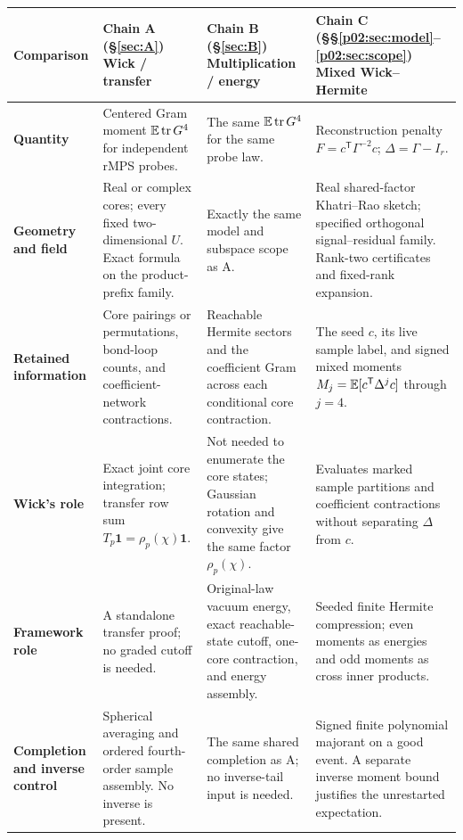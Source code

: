 \documentclass[11pt]{article}
\numberwithin{equation}{section}
\theoremstyle{definition}\newtheorem{definition}[theorem]{Definition}
\theoremstyle{remark}\newtheorem{remark}[theorem]{Remark}
\newcommand{\tr}{\operatorname{tr}}\newcommand{\Ent}{\operatorname{Ent}}
\newcommand{\one}{\mathbf1}\newcommand{\F}{\mathbb F}
\begin{document}
\begin{tabularx}{\textwidth}{@{}P{.14\textwidth}YYY@{}}
\toprule
\textbf{Comparison} &
{\color{Teal}\textbf{Chain A} (\S\ref{sec:A})\newline Wick / transfer} &
{\color{Navy}\textbf{Chain B} (\S\ref{sec:B})\newline Multiplication / energy} &
{\color{Amber}\textbf{Chain C} (\S\S\ref{p02:sec:model}--\ref{p02:sec:scope})\newline Mixed Wick--Hermite}\\
\midrule
{}
\textbf{Quantity} &
Centered Gram moment $\E\tr G^4$ for independent rMPS probes. &
The same $\E\tr G^4$ for the same probe law. &
Reconstruction penalty $F=c^{\mathsf T}\Gamma^{-2}c$;
$\Delta=\Gamma-I_r$.\\[3pt]
\textbf{Geometry and field} &
Real or complex cores; every fixed two-dimensional $U$.
Exact formula on the product-prefix family. &
Exactly the same model and subspace scope as A. &
Real shared-factor Khatri--Rao sketch; specified orthogonal signal--residual
family. Rank-two certificates and fixed-rank expansion.\\[3pt]
\textbf{Retained information} &
Core pairings or permutations, bond-loop counts, and coefficient-network
contractions. &
Reachable Hermite sectors and the coefficient Gram across each
conditional core contraction. &
The seed $c$, its live sample label, and signed mixed moments
$M_j=\mathbb E[c^{\mathsf T}\Delta^jc]$ through $j=4$.\\[3pt]
\textbf{Wick's role} &
Exact joint core integration; transfer row sum
$T_p\one=\rho_p(\chi)\one$. &
Not needed to enumerate the core states; Gaussian rotation and convexity
give the same factor $\rho_p(\chi)$. &
Evaluates marked sample partitions and coefficient contractions without
separating $\Delta$ from $c$.\\[3pt]
\textbf{Framework role} &
A standalone transfer proof; no graded cutoff is needed. &
Original-law vacuum energy, exact reachable-state cutoff, one-core
contraction, and energy assembly. &
Seeded finite Hermite compression; even moments as energies and odd
moments as cross inner products.\\[3pt]
\textbf{Completion and inverse control} &
Spherical averaging and ordered fourth-order sample assembly.
No inverse is present. &
The same shared completion as A; no inverse-tail input is needed. &
Signed finite polynomial majorant on a good event. A separate inverse
moment bound justifies the unrestarted expectation.\\[3pt]

\end{tabularx}
\end{document}

